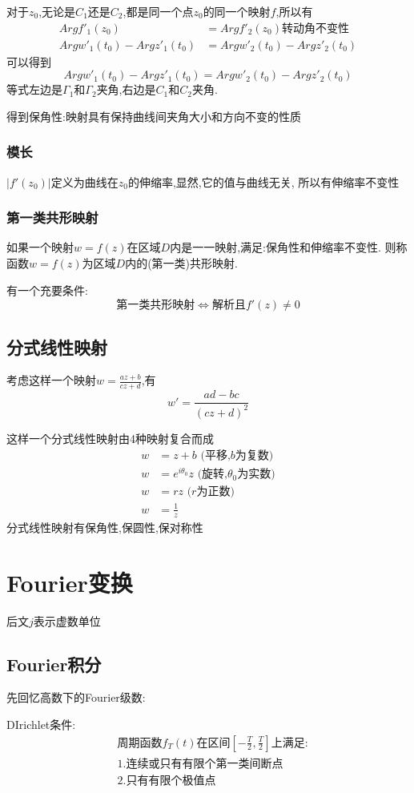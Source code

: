 \documentclass[12pt, a4paper, oneside]{ctexart}
\begin{document}
对于$z_0$,无论是$C_1$还是$C_2$,都是同一个点$z_0$的同一个映射$f$,所以有
\begin{align*}
    Arg f'_1(z_0) &= Arg f'_2(z_0)\text{转动角不变性}\\
    Arg w'_1(t_0) - Arg z'_1(t_0) &= Arg w'_2(t_0) - Arg z'_2(t_0)
\end{align*}
可以得到
\[
    Arg w'_1(t_0) - Arg z'_1(t_0) = Arg w'_2(t_0) - Arg z'_2(t_0)
\]
等式左边是$\Gamma_1$和$\Gamma_2$夹角,右边是$C_1$和$C_2$夹角.

得到保角性:映射具有保持曲线间夹角大小和方向不变的性质
\subsubsection{模长}
$|f'(z_0)|$定义为曲线在$z_0$的伸缩率,显然,它的值与曲线无关,
所以有伸缩率不变性
\subsubsection{第一类共形映射}
如果一个映射$w=f(z)$在区域$D$内是一一映射,满足:保角性和伸缩率不变性.
则称函数$w=f(z)$为区域$D$内的(第一类)共形映射.

有一个充要条件:
\[
    \text{第一类共形映射} \Leftrightarrow \text{解析且}f'(z) \ne 0
\]
\subsection{分式线性映射}
考虑这样一个映射$w=\frac{az+b}{cz+d}$,有
\[
    w'=\frac{ad-bc}{(cz+d)^2}
\]

这样一个分式线性映射由4种映射复合而成
\begin{align*}
    w&=z+b \text{ (平移,$b$为复数)}\\
    w&=e^{i\theta_0}z \text{ (旋转,$\theta_0$为实数)}\\
    w&=rz \text{ ($r$为正数)}\\
    w&=\frac{1}{z}
\end{align*}
分式线性映射有保角性,保圆性,保对称性
\section{Fourier变换}
后文$j$表示虚数单位
\subsection{Fourier积分}
先回忆高数下的Fourier级数:

DIrichlet条件:
\begin{align*}
    &\text{周期函数$f_T(t)$在区间$[-\frac{T}{2},\frac{T}{2}]$上满足:}\\
    &\text{1.连续或只有有限个第一类间断点}\\
    &\text{2.只有有限个极值点}
\end{align*}
\end{document}
